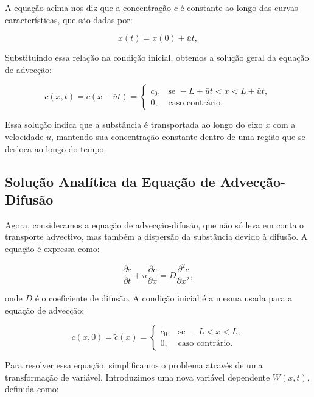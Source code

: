 A equação acima nos diz que a concentração \( c \) é constante ao longo das curvas características, que são dadas por:

\begin{equation}
    x(t) = x(0) + \bar{u} t,
\end{equation}

Substituindo essa relação na condição inicial, obtemos a solução geral da equação de advecção:

\begin{equation}
    c(x, t) = \tilde{c}(x - \bar{u}t) = \begin{cases}
        c_0, & \text{se } -L + \bar{u}t < x < L + \bar{u}t, \\
        0,   & \text{caso contrário}.
    \end{cases}
\end{equation}

Essa solução indica que a substância é transportada ao longo do eixo \( x \) com a velocidade \( \bar{u} \), mantendo sua concentração constante dentro de uma região que se desloca ao longo do tempo.

\subsection{Solução Analítica da Equação de Advecção-Difusão}

Agora, consideramos a equação de advecção-difusão, que não só leva em conta o transporte advectivo, mas também a dispersão da substância devido à difusão. A equação é expressa como:

\begin{equation}
    \frac{\partial c}{\partial t} + \bar{u} \frac{\partial c}{\partial x} = D \frac{\partial^2 c}{\partial x^2},
\end{equation}

onde \( D \) é o coeficiente de difusão. A condição inicial é a mesma usada para a equação de advecção:

\begin{equation}
    c(x, 0) = \tilde{c}(x) = \begin{cases}
        c_0, & \text{se } -L < x < L, \\
        0,   & \text{caso contrário}.
    \end{cases}
\end{equation}

Para resolver essa equação, simplificamos o problema através de uma transformação de variável. Introduzimos uma nova variável dependente \( W(x, t) \), definida como:

